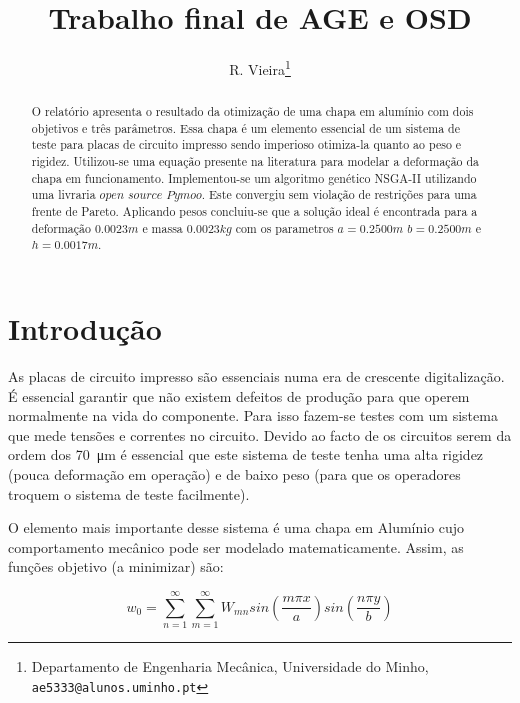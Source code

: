 \documentclass[a4paper,12pt]{article}
\begin{document}
%
\title{Trabalho final de AGE e OSD}


\author{R. Vieira\thanks{Departamento de Engenharia Mecânica, Universidade do Minho, {\tt ae5333@alunos.uminho.pt}}}

\maketitle              %

\begin{abstract}
O relatório apresenta o resultado da otimização de uma chapa em alumínio com dois objetivos e três parâmetros. Essa chapa é um elemento essencial de um sistema de teste para placas de circuito impresso sendo imperioso otimiza-la quanto ao peso e rigidez. Utilizou-se uma equação presente na literatura para modelar a deformação da chapa em funcionamento. Implementou-se um algoritmo genético NSGA-II utilizando uma livraria $open$ $source$ $Pymoo$. Este convergiu sem violação de restrições para uma frente de Pareto. Aplicando pesos concluiu-se que a solução ideal é encontrada para a deformação $0.0023m$ e massa $0.0023kg$ com os parametros $a=0.2500m$ $b=0.2500m$ e $h=0.0017m$.
\end{abstract}


\section{Introdução}

As placas de circuito impresso são essenciais numa era de crescente digitalização. É essencial garantir que não existem defeitos de produção para que operem normalmente na vida do componente. Para isso fazem-se testes com um sistema que mede tensões e correntes no circuito. Devido ao facto de os circuitos serem da ordem dos \SI{70}{\micro\metre} é essencial que este sistema de teste tenha uma alta rigidez (pouca deformação em operação) e de baixo peso (para que os operadores troquem o sistema de teste facilmente). 

O elemento mais importante desse sistema é uma chapa em Alumínio cujo comportamento mecânico pode ser modelado matematicamente. Assim, as funções objetivo (a minimizar) são:


\begin{equation}\label{eq:deform}
w_0= \sum_{n=1}^{\infty} \sum_{m=1}^{\infty} W_{mn} sin\left(\frac{m \pi x}{a}\right) sin\left(\frac{n \pi y}{b}\right)
\end{equation}
\end{document}
